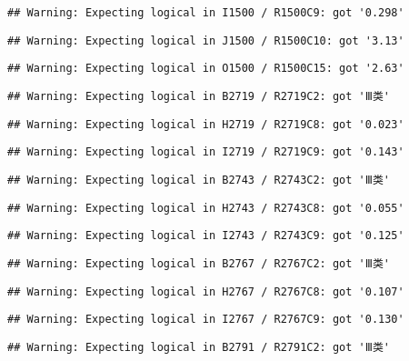 \documentclass[
]{article}
\begin{document}
\begin{verbatim}
## Warning: Expecting logical in I1500 / R1500C9: got '0.298'
\end{verbatim}

\begin{verbatim}
## Warning: Expecting logical in J1500 / R1500C10: got '3.13'
\end{verbatim}

\begin{verbatim}
## Warning: Expecting logical in O1500 / R1500C15: got '2.63'
\end{verbatim}

\begin{verbatim}
## Warning: Expecting logical in B2719 / R2719C2: got 'Ⅲ类'
\end{verbatim}

\begin{verbatim}
## Warning: Expecting logical in H2719 / R2719C8: got '0.023'
\end{verbatim}

\begin{verbatim}
## Warning: Expecting logical in I2719 / R2719C9: got '0.143'
\end{verbatim}

\begin{verbatim}
## Warning: Expecting logical in B2743 / R2743C2: got 'Ⅲ类'
\end{verbatim}

\begin{verbatim}
## Warning: Expecting logical in H2743 / R2743C8: got '0.055'
\end{verbatim}

\begin{verbatim}
## Warning: Expecting logical in I2743 / R2743C9: got '0.125'
\end{verbatim}

\begin{verbatim}
## Warning: Expecting logical in B2767 / R2767C2: got 'Ⅲ类'
\end{verbatim}

\begin{verbatim}
## Warning: Expecting logical in H2767 / R2767C8: got '0.107'
\end{verbatim}

\begin{verbatim}
## Warning: Expecting logical in I2767 / R2767C9: got '0.130'
\end{verbatim}

\begin{verbatim}
## Warning: Expecting logical in B2791 / R2791C2: got 'Ⅲ类'
\end{verbatim}
\end{document}
